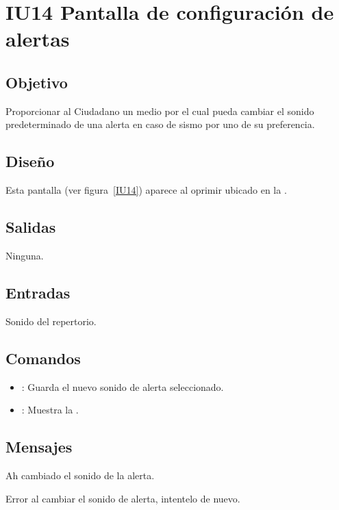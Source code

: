 \section{IU14 Pantalla de configuración de alertas}

\subsection{Objetivo}
	Proporcionar al Ciudadano un medio por el cual pueda cambiar el sonido predeterminado de una alerta en caso de sismo por uno de su preferencia.

\subsection{Diseño}
	Esta pantalla  (ver figura~\ref{IU14}) aparece al oprimir  ubicado en la .
	

\subsection{Salidas}

	Ninguna.

\subsection{Entradas}
	Sonido del repertorio.

\subsection{Comandos}
\begin{itemize}
	\item {}: Guarda el nuevo sonido de alerta seleccionado.
	\item {}: Muestra la .
\end{itemize}

\subsection{Mensajes}

\begin{Citemize}
	\item Ah cambiado el sonido de la alerta.
	\item Error al cambiar el sonido de alerta, intentelo de nuevo.
\end{Citemize}

\clearpage